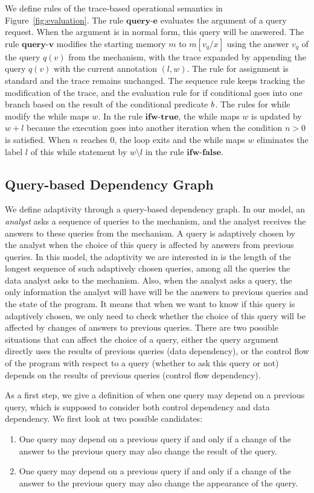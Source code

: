\documentclass[a4paper,11pt]{article}
\begin{document}
%
{
We define rules of the trace-based operational semantics in Figure~\ref{fig:evaluation}.
The rule $\textbf{query-e}$ evaluates the argument of a query request. When the argument is in normal form, this query will be answered.
%
The rule $\textbf{query-v}$ modifies the starting memory $m$ to $m[v_q/x]$ using the answer $v_q$ of the query $q(v)$ from the mechanism, with the trace expanded by appending the query $q(v)$ with the current annotation $(l,w)$. 
%
The rule for assignment is standard and the trace remains unchanged.%
The sequence rule keeps tracking the modification of the trace, and the evaluation rule for if conditional goes into one branch based on the result of the conditional predicate $b$. 
%
The rules for while modify the while maps $w$. 
In the rule $\textbf{ifw-true}$, the while maps $w$ is updated by $w + l$ because the execution goes into another iteration when the condition $n >0$ is satisfied. 
%
When $n$ reaches $0$, the loop exits and the while maps $w$ eliminates the label $l$ of this while statement by $w \setminus l$ in the rule $\textbf{ifw-false}$.  
}   
%
{
\subsection{ Query-based Dependency Graph}
%
We define adaptivity through a query-based dependency graph. In our model, an \emph{analyst} asks a sequence of queries to the mechanism, and the analyst receives the answers to these queries from the mechanism. A query is adaptively chosen by the analyst when the choice of this query is affected by answers from previous queries. In this model, the adaptivity we are interested in is the length of the longest sequence of such adaptively chosen queries, among all the queries the data analyst asks to the mechanism.  Also, when the analyst asks a query, the only information the analyst will have will be the answers to previous queries and the state of the program. It means that when we want to know if this query is adaptively chosen, we only need to check whether the choice of this query will be affected by changes of answers to previous queries. There are two possible situations that can  affect the choice of a query,  
either the query argument directly uses the results of previous queries (data dependency), or the control flow of the program with respect to a query (whether to ask this query or not) depends on the results of previous queries (control flow dependency).
}

{
As a first step, we give a definition of when one query may depend on a previous query, which is supposed to consider both control dependency and data dependency. We first look at two possible candidates:
\begin{enumerate}
    \item One query may depend on a previous query if and only if a change of the answer to the previous query may also change the result of the query.
    \item One query may depend on a previous query if and only if a change of the answer to the previous query may also change the appearance of the query.
\end{enumerate}
}
\end{document}
